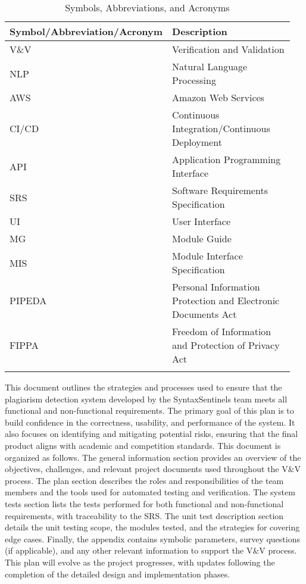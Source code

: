 \documentclass[12pt, titlepage]{article}
\begin{document}
\renewcommand{\arraystretch}{1.2}
\begin{center}
  \begin{longtable}{| p{0.475\linewidth} | p{0.475\linewidth} |}
  \hline
  \textbf{Symbol/Abbreviation/Acronym} & \textbf{Description} \\
  \hline
  V\&V & Verification and Validation \\
  \hline
  NLP & Natural Language Processing \\
  \hline
  AWS & Amazon Web Services \\
  \hline
  CI/CD & Continuous Integration/Continuous Deployment \\
  \hline
  API & Application Programming Interface \\
  \hline
  SRS & Software Requirements Specification \\
  \hline
  UI & User Interface \\
  \hline
  MG & Module Guide \\
  \hline
  MIS & Module Interface Specification \\
  \hline
  PIPEDA & Personal Information Protection and Electronic Documents Act \\
  \hline
  FIPPA & Freedom of Information and Protection of Privacy Act \\
  \hline

  \caption{Symbols, Abbreviations, and Acronyms}
  \end{longtable}
  \end{center}

\newpage


This document outlines the strategies and processes used to ensure that the plagiarism detection system  developed by the SyntaxSentinels team meets all functional 
and non-functional requirements. The primary goal of this plan is to build confidence in the correctness, usability, and performance of the system. It also focuses 
on identifying and mitigating potential risks, ensuring that the final product aligns with academic and competition standards.
This document is organized as follows. The general information section provides an overview of the objectives, challenges, and relevant project documents 
used throughout the V\&V process. The plan section describes the roles and responsibilities of the team members and the tools used for automated testing and verification. 
The system tests section lists the tests performed for both functional and non-functional requirements, with traceability to the SRS. 
The unit test description section details the unit testing scope, the modules tested, and the strategies for covering edge cases. Finally, the appendix contains symbolic parameters, 
survey questions (if applicable), and any other relevant information to support the V\&V process. This plan will evolve as the project progresses, with updates following the completion 
of the detailed design and implementation phases.
\end{document}
